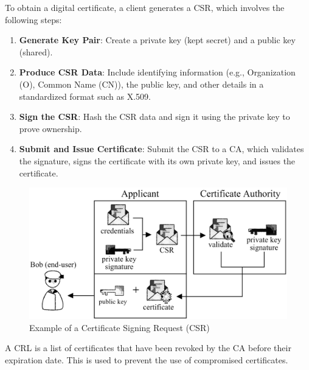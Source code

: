 \begin{Def}

    To obtain a digital certificate, a client generates a CSR, which involves the following steps:
    \begin{enumerate}
        \item \textbf{Generate Key Pair}: Create a private key (kept secret) and a public key (shared).
        \item \textbf{Produce CSR Data}: Include identifying information (e.g., Organization (O), Common Name (CN)), the public key, and other details in a standardized format such as X.509.
        \item \textbf{Sign the CSR}: Hash the CSR data and sign it using the private key to prove ownership.
        \item \textbf{Submit and Issue Certificate}: Submit the CSR to a CA, which validates the signature, signs the certificate with its own private key, and issues the certificate.
        \hfill \cite{rfc2986}
    \end{enumerate}
\end{Def}


\begin{figure}[h!]
    \centering
    \includegraphics[width=1\textwidth]{Sections/sec/csr.png}
    \caption{Example of a Certificate Signing Request (CSR)}
    \label{fig:csr}
\end{figure}

\begin{Def}

    A CRL is a list of certificates that have been revoked by the CA before their expiration date.
    This is used to prevent the use of compromised certificates.
    \hfill \cite{rfc5280}
\end{Def}

